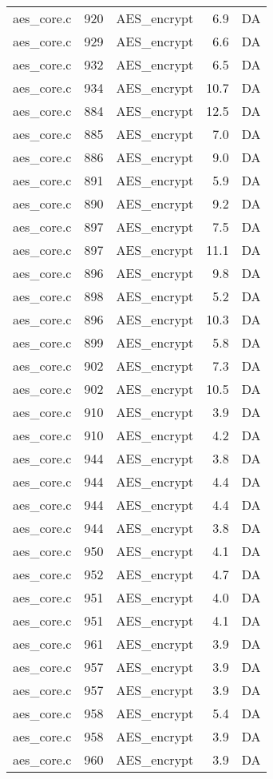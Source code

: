 \begin{table}[!ht]
\begin{tabular}{lrlrr}
aes\_core.c& 920&AES\_encrypt&6.9 &DA\\
aes\_core.c& 929&AES\_encrypt&6.6 &DA\\
aes\_core.c& 932&AES\_encrypt&6.5 &DA\\
aes\_core.c& 934&AES\_encrypt&10.7 &DA\\
aes\_core.c& 884&AES\_encrypt&12.5 &DA\\
aes\_core.c& 885&AES\_encrypt&7.0 &DA\\
aes\_core.c& 886&AES\_encrypt&9.0 &DA\\
aes\_core.c& 891&AES\_encrypt&5.9 &DA\\
aes\_core.c& 890&AES\_encrypt&9.2 &DA\\
aes\_core.c& 897&AES\_encrypt&7.5 &DA\\
aes\_core.c& 897&AES\_encrypt&11.1 &DA\\
aes\_core.c& 896&AES\_encrypt&9.8 &DA\\
aes\_core.c& 898&AES\_encrypt&5.2 &DA\\
aes\_core.c& 896&AES\_encrypt&10.3 &DA\\
aes\_core.c& 899&AES\_encrypt&5.8 &DA\\
aes\_core.c& 902&AES\_encrypt&7.3 &DA\\
aes\_core.c& 902&AES\_encrypt&10.5 &DA\\
aes\_core.c& 910&AES\_encrypt&3.9 &DA\\
aes\_core.c& 910&AES\_encrypt&4.2 &DA\\
aes\_core.c& 944&AES\_encrypt&3.8 &DA\\
aes\_core.c& 944&AES\_encrypt&4.4 &DA\\
aes\_core.c& 944&AES\_encrypt&4.4 &DA\\
aes\_core.c& 944&AES\_encrypt&3.8 &DA\\
aes\_core.c& 950&AES\_encrypt&4.1 &DA\\
aes\_core.c& 952&AES\_encrypt&4.7 &DA\\
aes\_core.c& 951&AES\_encrypt&4.0 &DA\\
aes\_core.c& 951&AES\_encrypt&4.1 &DA\\
aes\_core.c& 961&AES\_encrypt&3.9 &DA\\
aes\_core.c& 957&AES\_encrypt&3.9 &DA\\
aes\_core.c& 957&AES\_encrypt&3.9 &DA\\
aes\_core.c& 958&AES\_encrypt&5.4 &DA\\
aes\_core.c& 958&AES\_encrypt&3.9 &DA\\
aes\_core.c& 960&AES\_encrypt&3.9 &DA\\
\hline
\end{tabular}
\renewcommand{\baselinestretch}{1.0}\selectfont
\end{table}
